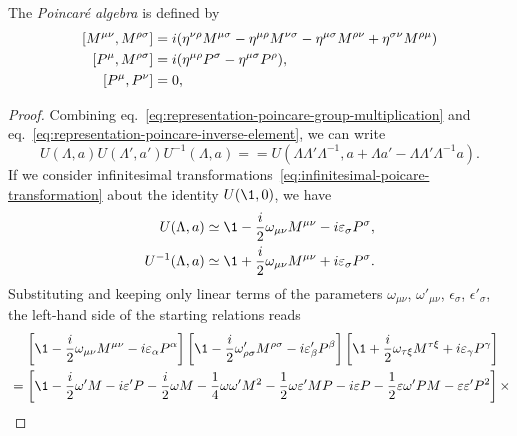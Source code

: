 The \emph{Poincaré algebra} is defined by
\begin{subequations}\label{eq:poincare-comm-relations}
    \begin{align}
        \comm{M^{\mu\nu}}{M^{\rho\sigma}} &= i ( \eta^{\nu\rho}M^{\mu\sigma} - \eta^{\mu\rho}M^{\nu\sigma} - \eta^{\mu\sigma}M^{\rho\nu} + \eta^{\sigma\nu}M^{\rho\mu}) \label{eq:comm-poincare-lorentz}\\
        \comm{P^\mu}{M^{\rho\sigma}} &= i (\eta^{\mu\rho} P^\sigma - \eta^{\mu\sigma} P^\rho),
        \label{eq:comm-poincare-lorentzmomentum}\\
        \comm{P^\mu}{P^\nu} &= 0 \label{eq:comm-poincare-momentum},
\end{align}
\end{subequations}
\begin{mdframed}
\begin{proof}
    Combining eq.~\eqref{eq:representation-poincare-group-multiplication} and eq.~\eqref{eq:representation-poincare-inverse-element}, we can write
    \begin{equation*}
        U(\Lambda, a) U(\Lambda',a') U^{-1}(\Lambda,a) =  = U(\Lambda \Lambda' \Lambda^{-1}, a + \Lambda a' - \Lambda \Lambda' \Lambda^{-1}a) .
    \end{equation*}
    If we consider infinitesimal transformations~\eqref{eq:infinitesimal-poicare-transformation} about the identity $U(\1,0)$, we have
    \begin{align*}
        U(\Lambda,a) &\simeq \1 -\frac{i}{2} \omega_{\mu\nu} M^{\mu\nu} - i \epsilon_\sigma P^\sigma, \\ 
        {U^{-1}}(\Lambda,a) &\simeq \1 +\frac{i}{2} \omega_{\mu\nu} M^{\mu\nu} + i \epsilon_\sigma P^\sigma .
    \end{align*}
    Substituting and keeping only linear terms of the parameters $\omega_{\mu\nu}$, $\omega'_{\mu\nu}$, $\epsilon_\sigma$, $\epsilon'_\sigma$, the left-hand side of the starting relations reads
    \begin{align*}
        &\quad \,\left[ \1 -\frac{i}{2} \omega_{\mu\nu} M^{\mu\nu} - i \epsilon_\alpha P^\alpha  \right] \left[ \1 -\frac{i}{2} \omega'_{\rho\sigma} M^{\rho\sigma} - i \epsilon'_\beta P^\beta  \right] \left[ \1 +\frac{i}{2} \omega_{\tau\xi} M^{\tau\xi} + i \epsilon_\gamma P^\gamma  \right] \\
        &=\left[ \1 - \frac{i}{2} \omega' M - i \epsilon' P - \frac{i}{2} \omega M - \frac{1}{4} \omega \omega' M^2 - \frac{1}{2} \omega \epsilon' M P - i \epsilon P - \frac{1}{2} \epsilon \omega' P M - \epsilon \epsilon' P^2 \right] \times \\

\end{align*}
\end{proof}
\end{mdframed}
